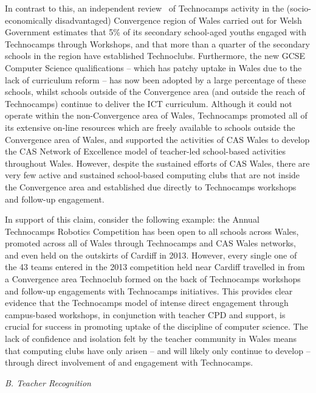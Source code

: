 \documentclass[conference]{IEEEtran}
\begin{document}
In contrast to this, an independent review~\cite{Wavehill:2015} of
Technocamps activity in the (socio-economically disadvantaged)
Convergence region of Wales carried out for Welsh Government estimates
that 5\% of its secondary school-aged youths
engaged with Technocamps through Workshops, and that more than a
quarter of the secondary schools in the region have established
Technoclubs.  Furthermore, the new GCSE Computer Science
qualifications -- which has patchy uptake in Wales due to the lack of
curriculum reform -- has now been adopted by a large percentage of
these schools, whilst schools outside of the Convergence area (and
outside the reach of Technocamps) continue to deliver the ICT
curriculum. Although it could not operate within the non-Convergence area of
Wales, Technocamps promoted all of its extensive on-line resources
which are freely available to schools outside the Convergence area of
Wales, and supported the activities of CAS Wales to develop the CAS
Network of Excellence model of teacher-led school-based activities
throughout Wales. However, despite the sustained efforts of CAS
Wales, there are very few active and sustained school-based computing
clubs that are not inside the Convergence area and established due
directly to Technocamps workshops and follow-up engagement.

In support of this claim, consider the following example: the Annual
Technocamps Robotics Competition has been open to all schools across
Wales, promoted across all of Wales through Technocamps and CAS Wales
networks, and even held on the outskirts of Cardiff in 2013.  However,
every single one of the 43 teams entered in the 2013 competition held
near Cardiff travelled in from a Convergence area Technoclub formed on
the back of Technocamps workshops and follow-up engagements with
Technocamps initiatives. This provides clear evidence that the
Technocamps model of intense direct engagement through campus-based
workshops, in conjunction with teacher CPD and support, is crucial for
success in promoting uptake of the discipline of computer science. The
lack of confidence and isolation felt by the teacher community in
Wales means that computing clubs have only arisen -- and will likely
only continue to develop -- through direct involvement of and
engagement with Technocamps.

\noindent \textit{B. Teacher Recognition}
\end{document}

